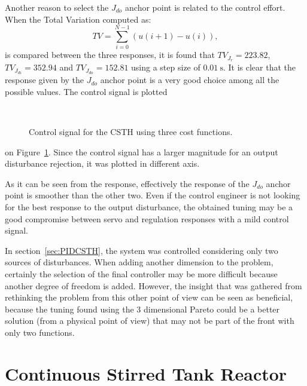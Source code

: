 Another reason to select the $J_{do}$ anchor point is related to the control effort. When the Total Variation computed as:
\begin{equation*}
TV = \sum_{i=0}^{N-1}\left(  u(i+1)-u(i)\right),
\end{equation*}
is compared between the three responses, it is found that $TV_{J_r} = 223.82$, $TV_{J_{di}} = 352.94$ and $TV_{J_{do}} = 152.81$ using a step size of $\SI{0.01}{\second}$. It is clear that the response given by the $J_{do}$ anchor point is a very good choice among all the possible values. The control signal is plotted %
%
\begin{figure}[tb]
	\centering
	\\
	\caption{Control signal for the CSTH using three cost functions.}
	\label{fig:Ch7CSTHControlledCV3Fun}
\end{figure}
%
on Figure~\ref{fig:Ch7CSTHControlledCV3Fun}. Since the control signal has a larger magnitude for an output disturbance rejection, it was plotted in different axis.

As it can be seen from the response, effectively the response of the $J_{do}$ anchor point is smoother than the other two. Even if the control engineer is not looking for the best response to the output disturbance, the obtained tuning may be a good compromise between servo and regulation responses with a mild control signal.

In section~\ref{sec:PIDCSTH}, the system was controlled considering only two sources of disturbances. When adding another dimension to the problem, certainly the selection of the final controller may be more difficult because another degree of freedom is added. However, the insight that was gathered from rethinking the problem from this other point of view can be seen as beneficial, because the tuning found using the 3 dimensional Pareto could be a better solution (from a physical point of view) that may not be part of the front with only two functions.
%
%
\section{Continuous Stirred Tank Reactor}
\label{sec:CSTRVandeVusse}
%
